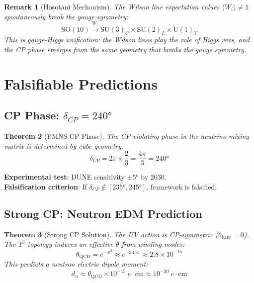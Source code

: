 \documentclass[12pt,a4paper]{article}
\newtheorem{theorem}{Theorem}[section]
\newtheorem{remark}[theorem]{Remark}
\begin{document}
\begin{remark}[Hosotani Mechanism]
The Wilson line expectation values $\langle W_i \rangle \neq \mathbb{1}$ spontaneously break the gauge symmetry:
\begin{equation}
\text{SO}(10) \xrightarrow{W_i} \text{SU}(3)_C \times \text{SU}(2)_L \times \text{U}(1)_Y
\end{equation}
This is \textit{gauge-Higgs unification}: the Wilson lines play the role of Higgs vevs, and the CP phase emerges from the same geometry that breaks the gauge symmetry.
\end{remark}

\section{Falsifiable Predictions}

\subsection{CP Phase: $\delta_{CP} = 240°$}

\begin{theorem}[PMNS CP Phase]
The CP-violating phase in the neutrino mixing matrix is determined by cube geometry:
\begin{equation}
\delta_{CP} = 2\pi \times \frac{2}{3} = \frac{4\pi}{3} = 240°
\end{equation}
\end{theorem}

\textbf{Experimental test}: DUNE sensitivity $\pm 5°$ by 2030.\\
\textbf{Falsification criterion}: If $\delta_{CP} \notin [235°, 245°]$, framework is falsified.

\subsection{Strong CP: Neutron EDM Prediction}

\begin{theorem}[Strong CP Solution]
The UV action is CP-symmetric ($\theta_{\text{bare}} = 0$). The $T^3$ topology induces an effective $\theta$ from winding modes:
\begin{equation}
\theta_{\text{QCD}} = e^{-Z^2} \approx e^{-33.51} \approx 2.8 \times 10^{-15}
\end{equation}
This predicts a neutron electric dipole moment:
\begin{equation}
d_n \approx \theta_{\text{QCD}} \times 10^{-15}~e\cdot\text{cm} \approx 10^{-30}~e\cdot\text{cm}
\end{equation}
\end{theorem}
\end{document}
